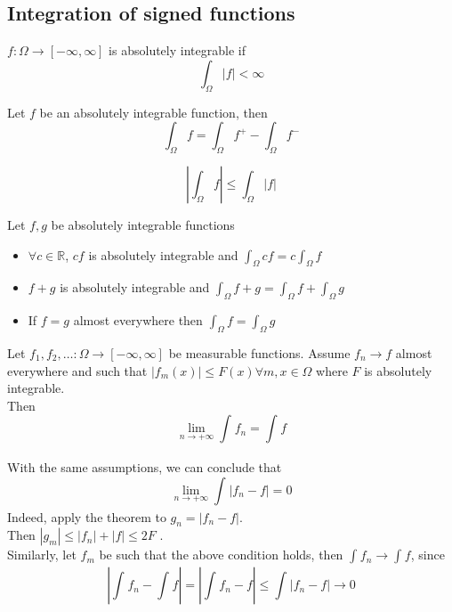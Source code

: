 \documentclass[../main.tex]{subfiles}
\begin{document}
\subsection{Integration of signed functions}
\begin{defn}
	$f: \Omega\to \left[ - \infty , \infty \right]  $ is absolutely integrable if
	\[ 
	\int_{ \Omega }^{  } |f| < \infty 
	\]
\end{defn}
\begin{defn}
	  Let $f$ be an absolutely integrable function, then
	  \[ 
	  \int_{ \Omega }^{  } f = \int_{ \Omega }^{  }f^{+} - \int_{ \Omega }^{  }f^{-}
	  \]
	  	
\end{defn}
\begin{rmq}
\[ 
| \int_{ \Omega }^{  } f | \leq  \int_{ \Omega }^{  }|f|
\]

\end{rmq}
\begin{propo}
Let $f,g$ be absolutely integrable functions
\begin{itemize}
\item $\forall c \in \mathbb{R}$, $cf$ is absolutely integrable and $ \int_{ \Omega }^{  }cf = c \int_{ \Omega }^{  }f$ 
\item $f+g$ is absolutely integrable and $ \int_{ \Omega }^{  } f+g = \int_{ \Omega }^{  }f+ \int_{ \Omega }^{  }g$ 
\item  If $f=g$ almost everywhere then $ \int_{ \Omega }^{  }f = \int_{ \Omega }^{  }g$ 
\end{itemize}
\end{propo}
\begin{thm}
	Let $f_1,f_2, \ldots: \Omega \to [ - \infty , \infty ] $ be measurable functions. Assume $f_n\to f$ almost everywhere and such that $|f_m( x) | \leq F( x) \forall m,x \in \Omega$ where $F$ is absolutely integrable.\\
	Then 
	\[ 
	\lim_{n \to  + \infty} \int_{  }^{  } f_n = \int_{  }^{  }f
	\]
	
\end{thm}
\begin{rmq}
With the same assumptions, we can conclude that
\[ 
\lim_{n \to  + \infty} \int_{  }^{  } |f_n -f| = 0
\]
Indeed, apply the theorem to $g_n = |f_n -f|$.\\
Then $|g_m| \leq |f_n| + |f| \leq  2F $ .\\
Similarly, let $f_m$ be such that the above condition holds, then $ \int_{  }^{  }f_n\to \int_{  }^{  }f$, since
\[ 
| \int_{  }^{  }f_n - \int_{  }^{  }f | = | \int_{  }^{  }f_n -f | \leq \int_{  }^{  } |f_n-f|\to 0
\]


\end{rmq}
\end{document}
